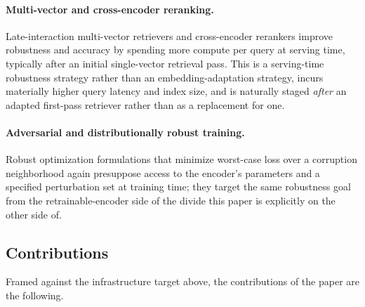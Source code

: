 \paragraph{Multi-vector and cross-encoder reranking.} Late-interaction
multi-vector retrievers and cross-encoder rerankers improve robustness and
accuracy by spending more compute per query at serving time, typically
after an initial single-vector retrieval pass. This is a serving-time
robustness strategy rather than an embedding-adaptation strategy, incurs
materially higher query latency and index size, and is naturally staged
\emph{after} an adapted first-pass retriever rather than as a replacement
for one.

\paragraph{Adversarial and distributionally robust training.} Robust
optimization formulations that minimize worst-case loss over a corruption
neighborhood again presuppose access to the encoder's parameters and a
specified perturbation set at training time; they target the same
robustness goal from the retrainable-encoder side of the divide this paper
is explicitly on the other side of.

\subsection{Contributions}
\label{sec:contributions}

Framed against the infrastructure target above, the contributions of the
paper are the following.

